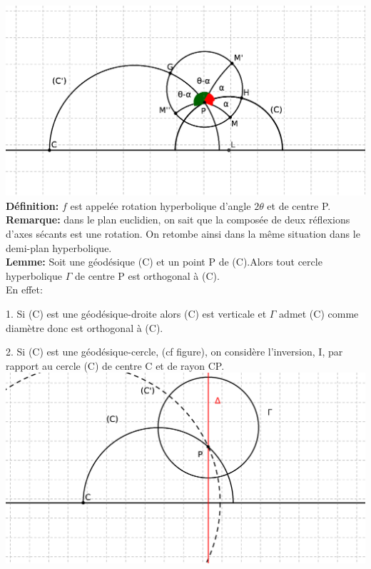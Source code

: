 \documentclass[a4paper, 12pt, twoside]{book}
\begin{document}
 \includegraphics[scale=0.6]{figures/isom21.eps}\\
 
 \textbf{Définition:} $f$ est appelée rotation hyperbolique d'angle $2\theta$ et de centre P.\\
 
 \textbf{Remarque:} dans le plan euclidien, on sait que la composée de deux réflexions d'axes sécants est une rotation. On retombe ainsi dans la même situation dans le demi-plan hyperbolique.\\
 
 
 
\textbf{ Lemme:} Soit une géodésique (C) et un point P de (C).Alors tout cercle hyperbolique $\Gamma$ de centre P est orthogonal à (C).\\

En effet: \

1. Si (C) est une géodésique-droite alors (C) est verticale et $\Gamma$ admet (C) comme diamètre donc est orthogonal à (C).\

2. Si (C) est une géodésique-cercle, (cf figure), on considère l'inversion, I, par rapport au cercle (C) de centre C et de rayon CP.\\

 \includegraphics[scale=0.3]{figures/isom22.eps}\\
\end{document}
